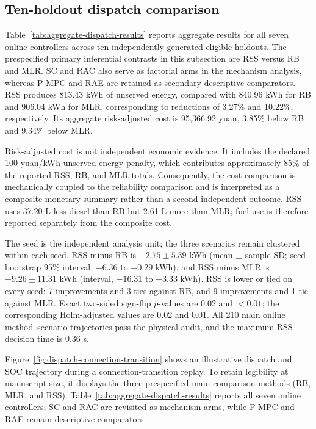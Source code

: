 \subsection{Ten-holdout dispatch
comparison}\label{frozen-dispatch-comparison}

Table~\ref{tab:aggregate-dispatch-results} reports aggregate results for all seven online controllers across ten
independently generated eligible holdouts. The prespecified primary
inferential contrasts in this subsection are RSS versus RB and MLR. SC and RAC
also serve as factorial arms in the mechanism analysis, whereas P-MPC and RAE
are retained as secondary descriptive comparators. RSS produces 813.43 kWh of
unserved energy, compared with 840.96 kWh for RB and 906.04 kWh for MLR,
corresponding to reductions of 3.27\% and 10.22\%, respectively. Its aggregate
risk-adjusted cost is 95,366.92 yuan, 3.85\% below RB and 9.34\% below MLR.

Risk-adjusted cost is not independent economic evidence. It includes the
declared 100 yuan/kWh unserved-energy penalty, which contributes approximately
85\% of the reported RSS, RB, and MLR totals. Consequently, the cost comparison
is mechanically coupled to the reliability comparison and is interpreted as a
composite monetary summary rather than a second independent outcome. RSS uses
37.20 L less diesel than RB but 2.61 L more than MLR; fuel use is therefore
reported separately from the composite cost.

The seed is the independent analysis unit; the three scenarios remain
clustered within each seed. RSS minus RB is $-2.75\pm5.39$ kWh (mean $\pm$
sample SD; seed-bootstrap 95\% interval, $-6.36$ to $-0.29$ kWh), and RSS
minus MLR is $-9.26\pm11.31$ kWh (interval, $-16.31$ to $-3.33$ kWh). RSS is
lower or tied on every seed: 7 improvements and 3 ties against RB, and 9
improvements and 1 tie against MLR. Exact two-sided sign-flip $p$-values are
0.02 and $<0.01$; the corresponding Holm-adjusted values are 0.02 and 0.01.
All 210 main online method--scenario trajectories pass the physical audit, and
the maximum RSS decision time is 0.36 s.

Figure~\ref{fig:dispatch-connection-transition} shows an illustrative dispatch and SOC trajectory during a
connection-transition replay. To retain legibility at manuscript size, it
displays the three prespecified main-comparison methods (RB, MLR, and RSS).
Table~\ref{tab:aggregate-dispatch-results} reports all seven online controllers; SC and RAC are revisited as
mechanism arms, while P-MPC and RAE remain descriptive comparators.

